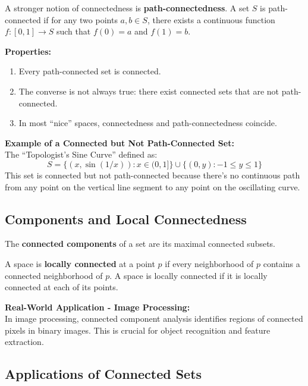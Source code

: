 \documentclass{article}
\begin{document}
A stronger notion of connectedness is \textbf{path-connectedness}. A set $S$ is path-connected if for any two points $a, b \in S$, there exists a continuous function $f: [0,1] \to S$ such that $f(0) = a$ and $f(1) = b$.

\textbf{Properties:}
\begin{enumerate}[label=(\arabic*)]
    \item Every path-connected set is connected.
    \item The converse is not always true: there exist connected sets that are not path-connected.
    \item In most ``nice'' spaces, connectedness and path-connectedness coincide.
\end{enumerate}

\textbf{Example of a Connected but Not Path-Connected Set:} \\
The ``Topologist's Sine Curve'' defined as:
\[
S = \{(x, \sin(1/x)) : x \in (0,1]\} \cup \{(0,y) : -1 \leq y \leq 1\}
\]
This set is connected but not path-connected because there's no continuous path from any point on the vertical line segment to any point on the oscillating curve.

\subsection{Components and Local Connectedness} \label{components}

The \textbf{connected components} of a set are its maximal connected subsets.

A space is \textbf{locally connected} at a point $p$ if every neighborhood of $p$ contains a connected neighborhood of $p$. A space is locally connected if it is locally connected at each of its points.

\textbf{Real-World Application - Image Processing:} \\
In image processing, connected component analysis identifies regions of connected pixels in binary images. This is crucial for object recognition and feature extraction.

\subsection{Applications of Connected Sets} \label{connected-sets-applications}
\end{document}
